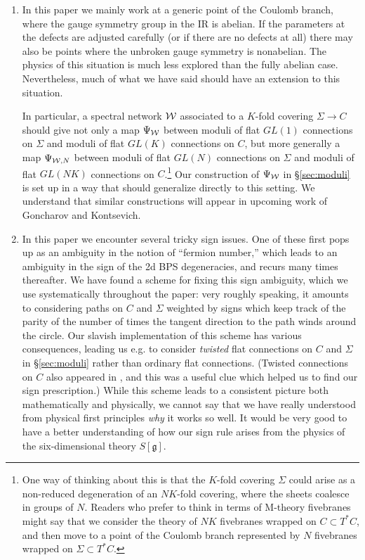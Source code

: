 \documentclass[11pt,a4paper]{article}
\def\fg{\mathfrak{g}}
\def\wnet {{\cal W}}
\newcommand{\ti}[1]{\textit{#1}}
\def\fg{\mathfrak{g}}
\def\wnet {{\cal W}}
\begin{document}
\begin{enumerate}
\item In this paper we mainly work at a generic point of the Coulomb branch, where the gauge
symmetry group in the IR is abelian.  If the parameters at the defects are adjusted carefully (or if there are no defects at all)
there may also be points where the unbroken gauge symmetry is nonabelian.
The physics of this situation is much less explored than the fully abelian case.
Nevertheless, much of what we have said should have an extension to this situation.

In particular, a spectral network $\wnet$ associated to a $K$-fold covering $\Sigma \to C$ should give not only
a map $\Psi_\wnet$ between moduli of flat $GL(1)$ connections on $\Sigma$ and moduli of
flat $GL(K)$ connections on $C$, but more generally a map $\Psi_{\wnet,N}$
between moduli of flat $GL(N)$ connections on $\Sigma$ and moduli of flat $GL(NK)$
connections on $C$.\footnote{One way of thinking about this is that the $K$-fold covering $\Sigma$
could arise as a non-reduced degeneration of an $NK$-fold covering, where the sheets coalesce in
groups of $N$.  Readers who prefer to think in terms of M-theory fivebranes might say that we
consider the theory of $NK$ fivebranes wrapped on $C \subset T^* C$,
and then move to a point of the Coulomb branch represented by $N$ fivebranes wrapped on $\Sigma \subset T^* C$.}
Our construction of $\Psi_\wnet$ in \S\ref{sec:moduli} is set up
in a way that should generalize directly to this setting.
We understand that similar constructions will appear in upcoming work of Goncharov and Kontsevich.

\item In this paper we encounter several tricky sign issues.  One of these
first pops up as an ambiguity in the notion of ``fermion number,'' which leads to an ambiguity in the sign of
the 2d BPS degeneracies, and recurs many times
thereafter.  We have found a scheme for fixing this sign ambiguity, which we use systematically
throughout the paper:  very roughly speaking, it amounts to
considering paths on $C$ and $\Sigma$ weighted by signs which keep track of the parity of
the number of times the tangent direction
to the path winds around the circle.  Our slavish implementation of this scheme
has various consequences,
leading us e.g. to consider \ti{twisted} flat connections on $C$ and $\Sigma$ in \S\ref{sec:moduli} rather than
ordinary flat connections.  (Twisted connections on $C$ also appeared in \cite{MR2233852}, and this was a useful clue which helped us to
find our sign prescription.)
While this scheme leads to a consistent picture both mathematically
and physically, we cannot say that we have really understood from physical first principles \ti{why} it works so well.  It would be very good to have a better understanding of how our sign rule arises from the physics of the six-dimensional theory $S[\fg]$.


\end{enumerate}
\end{document}
